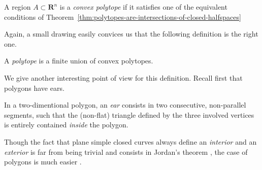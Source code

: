 \begin{definition}
    A region $ A \subset \mathbf R^n $ is a \textit{convex polytope} if it satisfies one of the equivalent conditions of Theorem~\ref{thm:polytopes-are-intersections-of-closed-halfspaces}
\end{definition}

Again, a small drawing easily convices us that the following definition is the right one.

\begin{definition}[Polytope]\label{def:polytopes}
    A \textit{polytope} is a finite union of convex polytopes.
\end{definition}

We give another interesting point of view for this definition. Recall first that polygons have ears.

\begin{definition}
    In a two-dimentional polygon, an \textit{ear} consists in two consecutive, non-parallel segments, such that the (non-flat) triangle defined by the three involved vertices is entirely contained \textit{inside} the polygon. 
\end{definition}

\begin{remark}
    Though the fact that plane simple closed curves always define an \textit{interior} and an \textit{exterior} is far from being trivial and consists in Jordan's theorem \cite{jordan1893}, the case of polygons is much easier \cite{courant1941}.
\end{remark}

